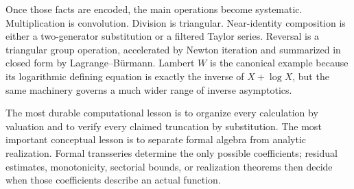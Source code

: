 \documentclass[11pt,oneside]{book}
\theoremstyle{definition}
\theoremstyle{remark}
\begin{document}
Once those facts are encoded, the main operations become systematic.
Multiplication is convolution. Division is triangular. Near-identity
composition is either a two-generator substitution or a filtered Taylor
series. Reversal is a triangular group operation, accelerated by Newton
iteration and summarized in closed form by Lagrange--B\"urmann. Lambert
$W$ is the canonical example because its logarithmic defining equation is
exactly the inverse of $X+\log X$, but the same machinery governs a much
wider range of inverse asymptotics.

The most durable computational lesson is to organize every calculation by
valuation and to verify every claimed truncation by substitution. The most
important conceptual lesson is to separate formal algebra from analytic
realization. Formal transseries determine the only possible coefficients;
residual estimates, monotonicity, sectorial bounds, or realization theorems
then decide when those coefficients describe an actual function.
\end{document}
